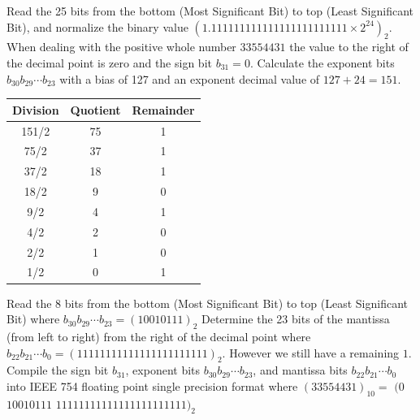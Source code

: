 \documentclass[main.tex]{subfiles}
\begin{document}
\begin{enumerate}
\begin{enumerate}
\begin{enumerate}
        \medskip
        
        Read the 25 bits from the bottom (Most Significant Bit) to top (Least Significant Bit), and normalize the binary value $(1.111111111111111111111111 \times 2^{24})_2$. When dealing with the positive whole number $33554431$ the value to the right of the decimal point is zero and the sign bit $b_{31} = 0$. Calculate the exponent bits $b_{30} b_{29} \cdots b_{23}$ with a bias of 127 and an exponent decimal value of $127+24=151$.
        
        \medskip
        
        \begin{center}
        \begin{tabular}{ |c c c| } 
            \hline
            Division & Quotient & Remainder\\  
            \hline\hline
            151/2 & 75 & 1 \\ 
            \hline
            75/2 & 37 & 1 \\ 
            \hline
            37/2 & 18 & 1 \\ 
            \hline
            18/2 & 9 & 0 \\ 
            \hline
            9/2 & 4 & 1 \\ 
            \hline
            4/2 & 2 & 0 \\ 
            \hline
            2/2 & 1 & 0 \\ 
            \hline
            1/2 & 0 & 1 \\ 
            \hline
        \end{tabular}
        \end{center}
        
        \medskip
        
        Read the 8 bits from the bottom (Most Significant Bit) to top (Least Significant Bit) where $b_{30}b_{29} \cdots b_{23} = (10010111)_2$ Determine the 23 bits of the mantissa (from left to right) from the right of the decimal point where $b_{22}b_{21} \cdots b_{0} = (11111111111111111111111)_{2}$. However we still have a remaining $1$. Compile the sign bit $b_{31}$, exponent bits $b_{30}b_{29} \cdots b_{23}$, and mantissa bits $b_{22}b_{21} \cdots b_{0}$ into IEEE 754 floating point single precision format where $(33554431)_{10} =$ $(0$ $10010111$ $11111111111111111111111)_2$ 
        
    \end{enumerate}
    

\end{enumerate}
\end{enumerate}
\end{document}
